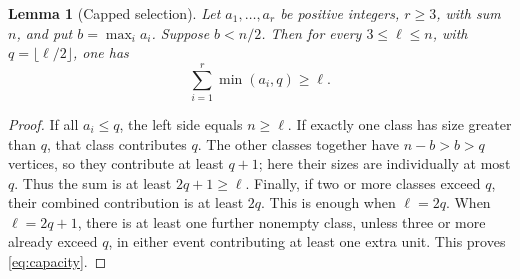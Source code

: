 \documentclass[11pt,letterpaper]{article}
\newtheorem{lemma}[theorem]{Lemma}
\begin{document}
\begin{lemma}[Capped selection]\label{lem:capacity}
Let $a_1,\ldots,a_r$ be positive integers, $r\ge3$, with sum $n$, and put
$b=\max_i a_i$.  Suppose $b<n/2$.  Then for every $3\le\ell\le n$, with
$q=\lfloor\ell/2\rfloor$, one has
\begin{equation}\label{eq:capacity}
\sum_{i=1}^{r}\min(a_i,q)\ge\ell.
\end{equation}
\end{lemma}
\begin{proof}
If all $a_i\le q$, the left side equals $n\ge\ell$.
If exactly one class has size greater than $q$, that class contributes $q$.
The other classes together have $n-b>b>q$ vertices, so they contribute
at least $q+1$; here their sizes are individually at most $q$.
Thus the sum is at least $2q+1\ge\ell$.
Finally, if two or more classes exceed $q$, their combined contribution
is at least $2q$.  This is enough when $\ell=2q$.  When $\ell=2q+1$,
there is at least one further nonempty class, unless three or more already
exceed $q$, in either event contributing at least one extra unit.
This proves \eqref{eq:capacity}.
\end{proof}
\end{document}

